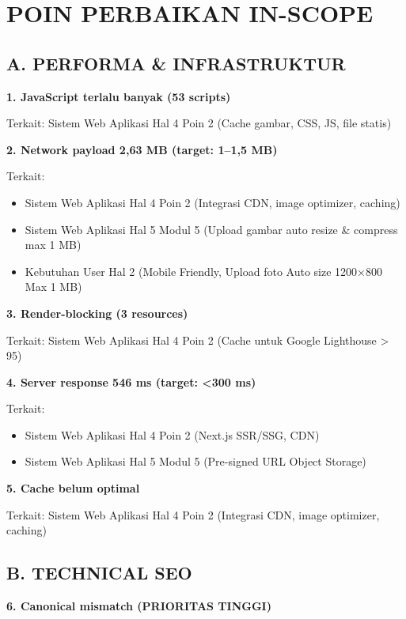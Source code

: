 \documentclass[12pt,a4paper]{article}
\begin{document}
\section*{POIN PERBAIKAN IN-SCOPE}

\subsection*{A. PERFORMA \& INFRASTRUKTUR}

\textbf{1. JavaScript terlalu banyak (53 scripts)}

Terkait: Sistem Web Aplikasi Hal 4 Poin 2 (Cache gambar, CSS, JS, file statis)

\textbf{2. Network payload 2,63 MB (target: 1--1,5 MB)}

Terkait:
\begin{itemize}[topsep=0pt, partopsep=0pt, itemsep=2pt]
    \item Sistem Web Aplikasi Hal 4 Poin 2 (Integrasi CDN, image optimizer, caching)
    \item Sistem Web Aplikasi Hal 5 Modul 5 (Upload gambar auto resize \& compress max 1 MB)
    \item Kebutuhan User Hal 2 (Mobile Friendly, Upload foto Auto size 1200×800 Max 1 MB)
\end{itemize}

\textbf{3. Render-blocking (3 resources)}

Terkait: Sistem Web Aplikasi Hal 4 Poin 2 (Cache untuk Google Lighthouse > 95)

\textbf{4. Server response 546 ms (target: <300 ms)}

Terkait:
\begin{itemize}[topsep=0pt, partopsep=0pt, itemsep=2pt]
    \item Sistem Web Aplikasi Hal 4 Poin 2 (Next.js SSR/SSG, CDN)
    \item Sistem Web Aplikasi Hal 5 Modul 5 (Pre-signed URL Object Storage)
\end{itemize}

\textbf{5. Cache belum optimal}

Terkait: Sistem Web Aplikasi Hal 4 Poin 2 (Integrasi CDN, image optimizer, caching)

\subsection*{B. TECHNICAL SEO}

\textbf{6. Canonical mismatch (PRIORITAS TINGGI)}
\end{document}
